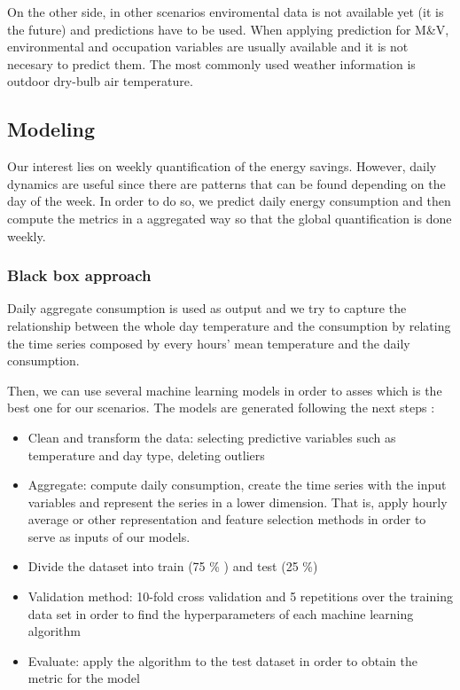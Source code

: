 \documentclass[3p,times,procedia]{elsarticle}
\begin{document}
On the other side, in other scenarios enviromental data is not available yet (it is the future) and predictions have to be used. When applying prediction for M\&V, environmental and occupation variables are usually available and it is not necesary to predict them. The most commonly used weather information is outdoor dry-bulb air temperature.


\subsection{Modeling}

Our interest lies on weekly quantification of the energy savings. However, daily dynamics are useful since there are patterns that can be found depending on the day of the week. In order to do so, we  predict daily energy consumption and then compute the metrics in a aggregated way so that the global quantification is done weekly.

\subsubsection{Black box approach}

Daily aggregate consumption is used as output and we try to capture the relationship between the whole day temperature and the consumption by relating the time series composed by every hours' mean temperature and the daily consumption.

Then, we can use several machine learning models in order to asses which is the best one for our scenarios. The models are generated  following the next steps \citep{gonzalez2016towards}:

\begin{itemize}
\item Clean and transform the data: selecting predictive variables such as temperature and day type, deleting outliers 
\item Aggregate: compute daily consumption, create the time series with the input variables and represent the series in a lower dimension. That is, apply hourly average or other representation and feature selection methods in order to serve as inputs of our models.
\item Divide the dataset into train (75 \% ) and test (25 \%)
\item Validation method: 10-fold cross validation and 5 repetitions over the training data set in order to find the hyperparameters of each machine learning algorithm
\item Evaluate: apply the algorithm to the test dataset in order to obtain the metric for the model
\end{itemize}
\end{document}
